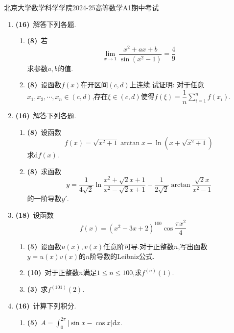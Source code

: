 \documentclass{ctexart}
\newcommand{\di}{\mathrm{d}}
\newcommand{\dx}{\di x}
\begin{document}
\pagestyle{empty}
\begin{center}\Large
    北京大学数学科学学院2024-25高等数学A1期中考试
\end{center}
\begin{enumerate}[leftmargin=*,label=\textbf{\arabic*.}]
    \item \textbf{(16)}\ 解答下列各题.
        \begin{enumerate}[label=\textbf{(\arabic*)}]
            \item \textbf{(8)}\ 若$$\lim_{x\to1}\dfrac{x^2+ax+b}{\sin\left(x^2-1\right)}=\dfrac{4}{9}$$求参数$a,b$的值.
            \item \textbf{(8)}\ 设函数$f(x)$在开区间$(c,d)$上连续.试证明:
                对于任意$x_1,x_2,\cdots,x_n\in(c,d)$,存在$\xi\in(c,d)$使得$\displaystyle f(\xi)=\dfrac{1}{n}\sum_{i=1}^{n}f(x_i)$.
        \end{enumerate}
        \item \textbf{(16)}\ 解答下列各题.
            \begin{enumerate}[label=\textbf{(\arabic*)}]
                \item \textbf{(8)}\ 设函数$$f(x)=\sqrt{x^2+1}\arctan x-\ln\left(x+\sqrt{x^2+1}\right)$$求$\di f(x)$.
                \item \textbf{(8)}\ 求函数$$y=\dfrac{1}{4\sqrt{2}}\ln\dfrac{x^2+\sqrt{2}x+1}{x^2-\sqrt{2}x+1}-\dfrac{1}{2\sqrt{2}}\arctan\dfrac{\sqrt{2}x}{x^2-1}$$的一阶导数$y'$.
            \end{enumerate}
        \item \textbf{(18)}\ 设函数$$f(x)=\left(x^2-3x+2\right)^{100}\cos\dfrac{\pi x^2}{4}$$
            \begin{enumerate}[label=\textbf{(\arabic*)}]
                \item \textbf{(5)}\ 设函数$u(x),v(x)$任意阶可导.对于正整数$n$,写出函数$y=u(x)v(x)$的$n$阶导数的Leibniz公式.
                \item \textbf{(10)}\ 对于正整数$n$满足$1\leqslant n\leqslant100$,求$f^{(n)}(1)$.
                \item \textbf{(3)}\ 求$f^{(101)}(2)$.
            \end{enumerate}
        \item \textbf{(16)}\ 计算下列积分.
            \begin{enumerate}[label=\textbf{(\arabic*)}]
                \item \textbf{(5)}\ $\displaystyle A=\int_{0}^{2\pi}\left|\sin x-\cos x\right|\dx$.

\end{enumerate}
\end{enumerate}
\end{document}
